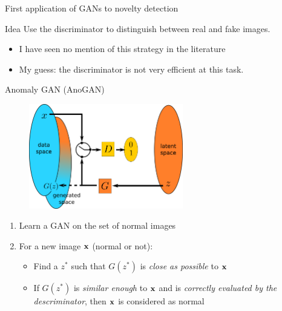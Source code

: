 \documentclass[xcolor=pdftex,dvipsnames,table,mathserif]{beamer}
\begin{document}
\begin{frame}{First application of GANs to novelty detection}

  \begin{block}{Idea}
    Use the discriminator to distinguish between real and fake images.
  \end{block}

  \begin{itemize}
  \item I have seen no mention of this strategy in the literature
  \item My guess: the discriminator is not very efficient at this task.
  \end{itemize}

\end{frame}


\begin{frame}{Anomaly GAN (AnoGAN) \cite{schlegl_unsupervised_2017}}

  \begin{figure}[ht]
    \centering
    \includegraphics[width=0.6\textwidth]{gan2}
  \end{figure}

  \begin{enumerate}
  \item Learn a GAN on the set of normal images
  \item For a new image $\mathbf{x}$ (normal or not):
    \begin{itemize}
    \item Find a $z^*$ such that $G(z^*)$ is \emph{close as possible} to $\mathbf{x}$
    \item If $G(z^*)$ is \emph{similar enough} to $\mathbf{x}$ and is \emph{correctly evaluated by the descriminator}, then $\mathbf{x}$ is considered as normal
    \end{itemize}
  \end{enumerate}

\end{frame}
\end{document}

